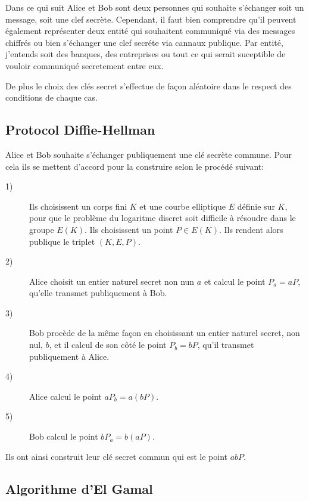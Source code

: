 Dans ce qui suit Alice et Bob sont deux personnes qui souhaite s'échanger soit un message, soit une clef secrète. Cependant, il faut bien comprendre qu'il peuvent également représenter deux entité qui souhaitent communiqué via des messages chiffrés ou bien s'échanger une clef secréte via cannaux publique. Par entité, j'entends soit des banques, des entreprises ou tout ce qui serait suceptible de vouloir communiqué secretement entre eux.

De plus le choix des clés secret s'effectue de façon aléatoire dans le respect des conditions de chaque cas.

\subsection{Protocol Diffie-Hellman}

Alice et Bob souhaite s'échanger publiquement une clé secrète commune. Pour cela ils se mettent d'accord pour la construire selon le procédé suivant:

\begin{description}
    \item[1)] Ils choisissent un corps fini $K$ et une courbe elliptique $E$ définie sur $K$, pour que le problème du logaritme discret soit difficile à résoudre dans le groupe $E(K)$. Ils choisissent un point $P \in E(K)$. Ils rendent alors publique le triplet $(K,E,P)$.

    \item[2)] Alice choisit un entier naturel secret non nun $a$ et calcul le point $P_a=aP$, qu'elle transmet publiquement à Bob.

    \item[3)] Bob procède de la même façon en choisissant un entier naturel secret, non nul, $b$, et il calcul de son côté le point $P_b=bP$, qu'il transmet publiquement à Alice.

    \item[4)] Alice calcul le point $aP_b=a(bP)$.

    \item[5)] Bob calcul le point $bP_a=b(aP)$.
\end{description}

Ils ont ainsi construit leur clé secret commun qui est le point $abP$.

\begin{probleme}
    
\end{probleme}

\subsection{Algorithme d'El Gamal}

